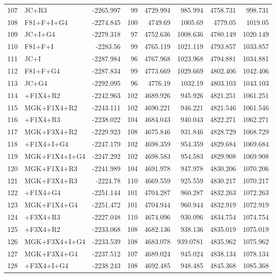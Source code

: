 \begin{longtable}{clrrrrrr}
	107 & JC+R3 & -2265.997 & 99 & 4729.994 & 985.994 & 4758.731 & 998.731 \\ 
	108 & F81+F+I+G4 & -2274.845 & 100 & 4749.69 & 1005.69 & 4779.05 & 1019.05 \\ 
	109 & JC+I+G4 & -2279.318 & 97 & 4752.636 & 1008.636 & 4780.149 & 1020.149 \\ 
	110 & F81+F+I & -2283.56 & 99 & 4765.119 & 1021.119 & 4793.857 & 1033.857 \\ 
	111 & JC+I & -2287.984 & 96 & 4767.968 & 1023.968 & 4794.881 & 1034.881 \\ 
	112 & F81+F+G4 & -2287.834 & 99 & 4773.669 & 1029.669 & 4802.406 & 1042.406 \\ 
	113 & JC+G4 & -2292.095 & 96 & 4776.19 & 1032.19 & 4803.103 & 1043.103 \\ 
	114 & \gy+F1X4+R2 & -2242.963 & 102 & 4689.926 & 945.926 & 4821.251 & 1061.251 \\ 
	115 & MGK+F1X4+R2 & -2243.111 & 102 & 4690.221 & 946.221 & 4821.546 & 1061.546 \\ 
	116 & \gy+F1X4+R3 & -2238.022 & 104 & 4684.043 & 940.043 & 4822.271 & 1062.271 \\ 
	117 & MGK+F3X4+R2 & -2229.923 & 108 & 4675.846 & 931.846 & 4828.729 & 1068.729 \\ 
	118 & \gy+F1X4+I+G4 & -2247.179 & 102 & 4698.359 & 954.359 & 4829.684 & 1069.684 \\ 
	119 & MGK+F1X4+I+G4 & -2247.292 & 102 & 4698.583 & 954.583 & 4829.908 & 1069.908 \\ 
	120 & MGK+F1X4+R3 & -2241.989 & 104 & 4691.978 & 947.978 & 4830.206 & 1070.206 \\ 
	121 & MGK+F3X4+R3 & -2224.78 & 110 & 4669.559 & 925.559 & 4830.217 & 1070.217 \\ 
	122 & \gy+F1X4+G4 & -2251.144 & 101 & 4704.287 & 960.287 & 4832.263 & 1072.263 \\ 
	123 & MGK+F1X4+G4 & -2251.472 & 101 & 4704.944 & 960.944 & 4832.919 & 1072.919 \\ 
	124 & \gy+F3X4+R3 & -2227.048 & 110 & 4674.096 & 930.096 & 4834.754 & 1074.754 \\ 
	125 & \gy+F3X4+R2 & -2233.068 & 108 & 4682.136 & 938.136 & 4835.019 & 1075.019 \\ 
	126 & MGK+F3X4+I+G4 & -2233.539 & 108 & 4683.078 & 939.0781 & 4835.962 & 1075.962 \\ 
	127 & MGK+F3X4+G4 & -2237.512 & 107 & 4689.024 & 945.024 & 4838.134 & 1078.134 \\ 
	128 & \gy+F3X4+I+G4 & -2238.243 & 108 & 4692.485 & 948.485 & 4845.368 & 1085.368 \\ 

\end{longtable}
